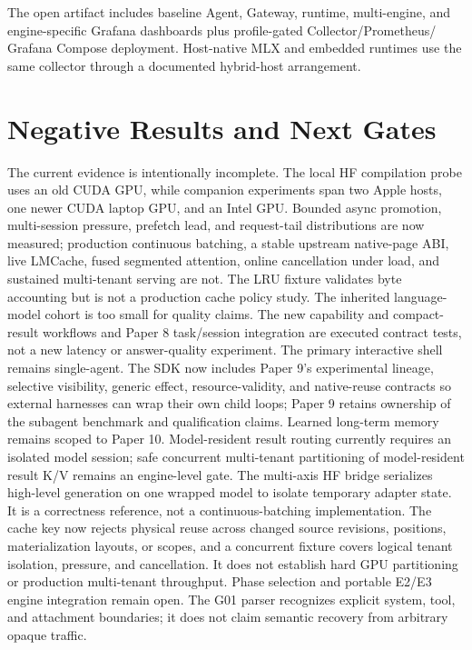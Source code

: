 \documentclass[11pt]{article}
\begin{document}
The open artifact includes baseline Agent, Gateway, runtime, multi-engine, and
engine-specific Grafana dashboards plus profile-gated Collector/Prometheus/
Grafana Compose deployment.  Host-native MLX and embedded runtimes use the same
collector through a documented hybrid-host arrangement.

\section{Negative Results and Next Gates}

The current evidence is intentionally incomplete. The local HF compilation
probe uses an old CUDA GPU, while companion experiments span two Apple hosts,
one newer CUDA laptop GPU, and an Intel GPU. Bounded async promotion,
multi-session pressure, prefetch lead, and request-tail distributions are now
measured; production continuous batching, a stable upstream native-page ABI,
live LMCache, fused segmented attention, online cancellation under load, and
sustained multi-tenant serving are not. The LRU fixture validates byte
accounting but is not a production cache policy study. The inherited language-model cohort is
too small for quality claims.  The new capability and compact-result workflows
and Paper 8 task/session integration are executed contract tests, not a new
latency or answer-quality experiment. The primary interactive shell remains
single-agent. The SDK now includes Paper 9's experimental lineage, selective
visibility, generic effect, resource-validity, and native-reuse contracts so
external harnesses can wrap their own child loops; Paper 9 retains ownership of
the subagent benchmark and qualification claims. Learned long-term memory
remains scoped to Paper 10.
Model-resident result routing currently requires an isolated model session; safe
concurrent multi-tenant partitioning of model-resident result K/V remains an
engine-level gate.
The multi-axis HF bridge serializes high-level generation on one wrapped model
to isolate temporary adapter state. It is a correctness reference, not a
continuous-batching implementation. The cache key now rejects physical reuse
across changed source revisions, positions, materialization layouts, or scopes,
and a concurrent fixture covers logical tenant isolation, pressure, and
cancellation. It does not establish hard GPU partitioning or production
multi-tenant throughput. Phase selection and portable E2/E3 engine integration remain
open. The G01 parser recognizes explicit
system, tool, and attachment boundaries; it does not claim semantic recovery
from arbitrary opaque traffic.
\end{document}
